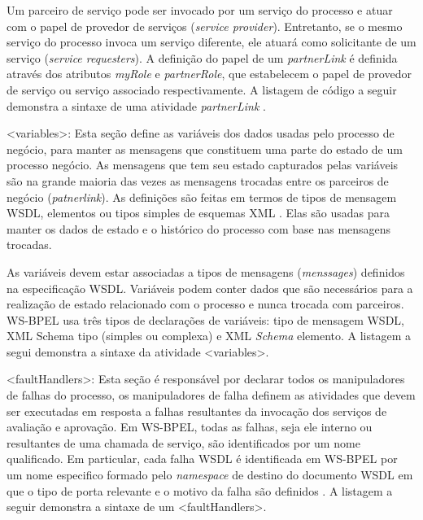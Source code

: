 Um parceiro de serviço pode ser invocado por um serviço do processo e atuar com o papel de provedor de serviços (\textit{service provider}). Entretanto, se o mesmo serviço do processo invoca um serviço diferente, ele atuará como solicitante de um serviço (\textit{service requesters}). A definição do papel de um \textit{partnerLink} é definida através dos atributos \textit{myRole} e \textit{partnerRole}, que estabelecem o papel de provedor de serviço ou serviço associado respectivamente. A listagem de código a seguir demonstra a sintaxe de uma atividade \textit{partnerLink} \cite{BPEL20}.



<variables>: Esta seção define as variáveis dos dados usadas pelo processo de negócio, para manter  as mensagens que constituem uma parte do estado de um processo negócio. As mensagens que tem seu estado capturados pelas variáveis são na grande maioria das vezes as mensagens trocadas entre  os parceiros de negócio (\textit{patnerlink}). As definições são feitas em termos de tipos de mensagem WSDL, elementos ou tipos simples de esquemas XML \cite{BPEL20}. Elas são usadas para manter os dados de estado e o histórico do processo com base nas mensagens trocadas. 

As variáveis devem estar associadas a tipos de mensagens (\textit{menssages}) definidos na especificação WSDL. Variáveis podem conter dados que são necessários para a realização de estado relacionado com o processo e nunca trocada com parceiros. WS-BPEL usa três tipos de declarações de variáveis: tipo de mensagem WSDL, XML Schema tipo (simples ou complexa) e XML \textit{Schema} elemento. A listagem a segui demonstra a sintaxe da atividade <variables>.



<faultHandlers>: Esta seção é responsável por declarar todos os manipuladores de falhas do processo, os manipuladores de falha definem as atividades que devem ser executadas em resposta a falhas resultantes da invocação dos serviços de avaliação e aprovação. Em WS-BPEL, todas as falhas, seja ele interno ou resultantes de uma chamada de serviço, são identificados por um nome qualificado. Em particular, cada falha WSDL é identificada em WS-BPEL por um nome especifico formado pelo \textit{namespace} de destino do documento WSDL em que o tipo de porta relevante e o motivo da falha são definidos \cite{BPEL20}. A listagem a seguir demonstra a sintaxe de um <faultHandlers>.

